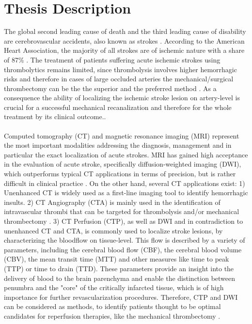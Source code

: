 \documentclass{article}%
\begin{document}
\section*{Thesis Description}
The global second leading cause of death and the third leading cause of disability are cerebrovascular accidents, also known as strokes \cite{JohnsonStroke, DONNAN20081612}. According to the American Heart Association, the majority of all strokes are of ischemic nature with a share of 87\% \cite{mozaffarian2016heart}. The treatment of patients suffering acute ischemic strokes using thrombolytics remains limited, since thrombolysis involves higher hemorrhagic risks and therefore in cases of large occluded arteries the mechanical/surgical thrombectomy can be the the superior and the preferred method \cite{torbey2013stroke, el2017thrombolysis}. As a consequence the ability of localizing the ischemic stroke lesion on artery-level is crucial for a successful mechanical recanalization and therefore for the whole treatment by its clinical outcome.\cite{torbey2013stroke, palaniswami2015mechanical}.\\\\
Computed tomography (CT) and magnetic resonance imaging (MRI) represent the most important modalities addressing the diagnosis, management and in particular the exact localization of acute strokes. MRI has gained high acceptance in the evaluation of acute stroke, specifically diffusion-weighted imaging (DWI), which outperforms typical CT applications in terms of precision, but is rather difficult in clinical practice \cite{schaefer2002diffusion, lansberg2000comparison}. On the other hand, several CT applications exist: 1) Unenhanced CT is widely used as a first-line imaging tool to identify hemorrhagic insults. 2) CT Angiography (CTA) is mainly used in the identification of  intravascular thrombi that can be targeted for thrombolysis and/or mechanical thrombectomy \cite{torbey2013stroke, gonzalez2011acute}. 3) CT Perfusion (CTP), as well as DWI and in contradiction to unenhanced CT and CTA, is commonly used to localize stroke lesions, by characterizing the bloodflow on tissue-level. This flow is described by a variety of parameters, including the cerebral blood flow (CBF), the cerebral blood volume (CBV), the mean transit time (MTT) and other measures like time to peak (TTP) or time to drain (TTD). These parameters provide an insight into the delivery of blood to the brain parenchyma and enable the distinction between penumbra and the "core" of the critically infarcted tissue, which is of high importance for further revascularization procedures. Therefore, CTP and DWI can be considered as methods, to identify patients thought to be optimal candidates for reperfusion therapies, like the mechanical thrombectomy \cite{gonzalez2011acute, lin2016imaging, torbey2013stroke}. \\\\
\end{document}
